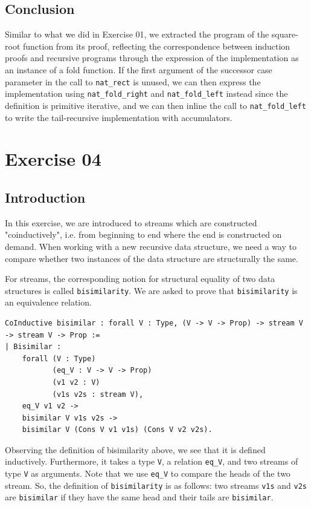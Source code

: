 \documentclass{article}
\begin{document}
\subsection{Conclusion}
Similar to what we did in Exercise 01, we extracted the program of the square-root function from its proof, reflecting the correspondence between induction proofs and recursive programs through the expression of the implementation as an instance of a fold function. If the first argument of the successor case parameter in the call to \texttt{nat\_rect} is unused, we can then express the implementation using \texttt{nat\_fold\_right} and \texttt{nat\_fold\_left} instead since the definition is primitive iterative, and we can then inline the call to \texttt{nat\_fold\_left} to write the tail-recursive implementation with accumulators.

\section{Exercise 04}

\subsection{Introduction}

In this exercise, we are introduced to streams which are constructed "coinductively", i.e. from beginning to end where the end is constructed on demand. When working with a new recursive data structure, we need a way to compare whether two instances of the data structure are structurally the same.

For streams, the corresponding notion for structural equality of two data structures is called \texttt{bisimilarity}. We are asked to prove that \texttt{bisimilarity} is an equivalence relation.

\begin{lstlisting}
CoInductive bisimilar : forall V : Type, (V -> V -> Prop) -> stream V -> stream V -> Prop :=
| Bisimilar :
    forall (V : Type)
           (eq_V : V -> V -> Prop)
           (v1 v2 : V)
           (v1s v2s : stream V),
    eq_V v1 v2 ->
    bisimilar V v1s v2s ->
    bisimilar V (Cons V v1 v1s) (Cons V v2 v2s).
\end{lstlisting}

Observing the definition of bisimilarity above, we see that it is defined inductively. Furthermore, it takes a type \texttt{V}, a relation \texttt{eq\_V}, and two streams of type \texttt{V} as arguments. Note that we use \texttt{eq\_V} to compare the heads of the two stream. So, the definition of \texttt{bisimilarity} is as follows: two streams \texttt{v1s} and \texttt{v2s} are \texttt{bisimilar} if they have the same head and their tails are \texttt{bisimilar}.
\end{document}
